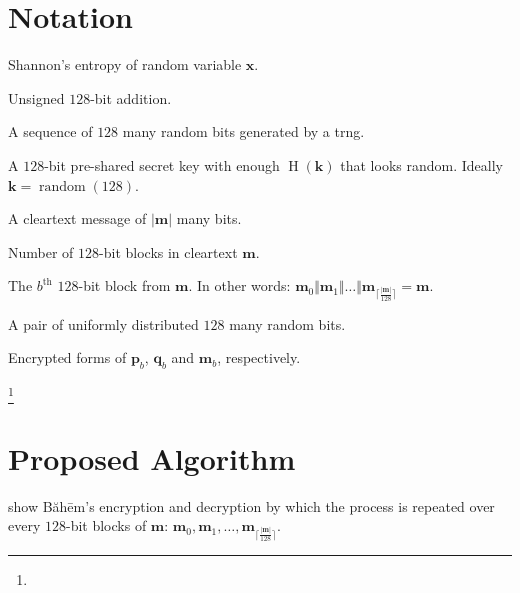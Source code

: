\documentclass[twocolumn,hidelinks]{article}
\newcommand{\baheem}{Băhēm}
\newcommand\blfootnote[1]{%
  \begingroup
  \renewcommand\thefootnote{}\footnote{#1}%
  \addtocounter{footnote}{-1}%
  \endgroup
}
\DeclareMathOperator{\random}{random}
\DeclareMathOperator{\entropy}{H}
\begin{document}
\section*{Notation}
\begin{description}[itemsep=0em]
    \item[$\entropy(\mathbf{x})$:]  Shannon's entropy of random variable
        $\mathbf{x}$.

    \item[$\mathbf{x} + \mathbf{y} \bmod{2^{128}}$:]  Unsigned $128$-bit
        addition.

    \item[$\random(128)$:]  A sequence of $128$ many random bits generated
        by a \gls{trng}.

    \item[$\mathbf{k}$:]  A $128$-bit pre-shared secret key with enough
        $\entropy(\mathbf{k})$ that looks random.  Ideally $\mathbf{k} =
        \random(128)$.

    \item[$\mathbf{m}$:]  A cleartext message of $|\mathbf{m}|$ many bits.

    \item[$\lceil\frac{|\mathbf{m}|}{128}\rceil$:]  Number of $128$-bit
        blocks in cleartext $\mathbf{m}$.

    \item[$\mathbf{m}_b$:]  The $b^{\text{th}}$ $128$-bit block from
        $\mathbf{m}$.  In other words: $\mathbf{m}_0 \Vert \mathbf{m}_1
        \Vert \ldots \Vert
        \mathbf{m}_{\lceil\frac{|\mathbf{m}|}{128}\rceil} = \mathbf{m}$.

    \item[$\mathbf{p}_b = \random(128), \mathbf{q}_b = \random(128)$:]  A
        pair of uniformly distributed $128$ many random bits.

    \item[$\mathbf{\hat p}_b, \mathbf{\hat q}_b, \mathbf{\hat m}_b$:]
        Encrypted forms of $\mathbf{p}_b$, $\mathbf{q}_b$ and
        $\mathbf{m}_b$, respectively.
\end{description}

\break

\tableofcontents

\blfootnote{\vspace{-1em}\doclicenseThis}

\section{Proposed Algorithm}
 show \baheem's encryption and decryption by which
the process is repeated over every $128$-bit blocks of $\mathbf{m}$:
$\mathbf{m}_0, \mathbf{m}_1, \ldots,
\mathbf{m}_{\lceil\frac{|\mathbf{m}|}{128}\rceil}$.
\end{document}
